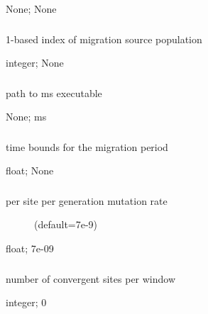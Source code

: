 \documentclass[letterpaper,12pt,english]{sphinxmanual}
\begin{document}
 None;  None


\subsubsection{}
\label{\detokenize{prog_desc:msource}}
 1-based index of migration source population

 integer;  None


\subsubsection{}
\label{\detokenize{prog_desc:mspath}}
 path to ms executable

 None;  ms


\subsubsection{}
\label{\detokenize{prog_desc:mtimes}}
 time bounds for the migration period

 float;  None


\subsubsection{}
\label{\detokenize{prog_desc:mu}}\begin{description}
\item[{ per site per generation mutation rate}] \leavevmode
(default=7e-9)

\end{description}

 float;  7e-09


\subsubsection{}
\label{\detokenize{prog_desc:nconverge}}
 number of convergent sites per window

 integer;  0
\end{document}
